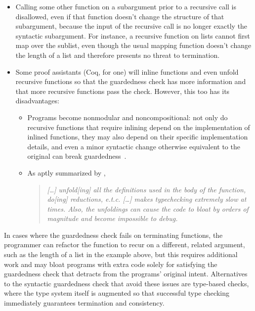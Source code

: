 \begin{itemize}
  \item Calling some other function on a subargument prior to a recursive call is disallowed,
    even if that function doesn't change the structure of that subargument,
    because the input of the recursive call is no longer exactly the syntactic subargument.
    For instance, a recursive function on lists cannot first map over the sublist,
    even though the usual mapping function doesn't change the length of a list
    and therefore presents no threat to termination.
  \item Some proof assistants (Coq, for one) will inline functions and even unfold recursive functions
    so that the guardedness check has more information
    and that more recursive functions pass the check.
    However, this too has its disadvantages:
    \begin{itemize}
      \item Programs become nonmodular and noncompositional:
        not only do recursive functions that require inlining
        depend on the implementation of inlined functions,
        they may also depend on their specific implementation details,
        and even a minor syntactic change otherwise equivalent to the original
        can break guardedness~\citep{CIC-hat-minus}.
      \item As aptly summarized by \citet{coqterm},
        \begin{quote}
        \begin{singlespace}
        \textit{{\rm [\ldots]} unfold{\rm [ing]} all the definitions used in the body of the function, do{\rm [ing]} reductions, e.t.c.
        {\rm [\ldots]} makes typechecking extremely slow at times.
        Also, the unfoldings can cause the code to bloat by orders of magnitude and become impossible to debug.}
        \end{singlespace}
        \end{quote}
    \end{itemize}
\end{itemize}

In cases where the guardedness check fails on terminating functions,
the programmer can refactor the function to recur on a different, related argument,
such as the length of a list in the example above,
but this requires additional work and may bloat programs
with extra code solely for satisfying the guardedness check
that detracts from the programs' original intent.
Alternatives to the syntactic guardedness check that avoid these issues are type-based checks,
where the type system itself is augmented so that successful type checking
immediately guarantees termination and consistency.

